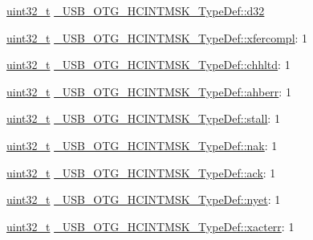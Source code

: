 \begin{DoxyCompactItemize}
\begin{tabbing}
\end{tabbing}\item 
\hyperlink{stdint_8h_a435d1572bf3f880d55459d9805097f62}{uint32\-\_\-t} \hyperlink{group___u_s_b___o_t_g___d_r_i_v_e_r_gac9280aa7152575d322edde06dbdb6aa4}{\-\_\-\-U\-S\-B\-\_\-\-O\-T\-G\-\_\-\-H\-C\-I\-N\-T\-M\-S\-K\-\_\-\-Type\-Def\-::d32}
\item 
\hyperlink{stdint_8h_a435d1572bf3f880d55459d9805097f62}{uint32\-\_\-t} \hyperlink{group___u_s_b___o_t_g___d_r_i_v_e_r_ga14412b191b38e4a7eb8f260ef7613fde}{\-\_\-\-U\-S\-B\-\_\-\-O\-T\-G\-\_\-\-H\-C\-I\-N\-T\-M\-S\-K\-\_\-\-Type\-Def\-::xfercompl}\-: 1
\item 
\hyperlink{stdint_8h_a435d1572bf3f880d55459d9805097f62}{uint32\-\_\-t} \hyperlink{group___u_s_b___o_t_g___d_r_i_v_e_r_ga520845ff45958d50ae4a81157db6e4d4}{\-\_\-\-U\-S\-B\-\_\-\-O\-T\-G\-\_\-\-H\-C\-I\-N\-T\-M\-S\-K\-\_\-\-Type\-Def\-::chhltd}\-: 1
\item 
\hyperlink{stdint_8h_a435d1572bf3f880d55459d9805097f62}{uint32\-\_\-t} \hyperlink{group___u_s_b___o_t_g___d_r_i_v_e_r_gada60e63ae630cebc4f260a670bc2a79f}{\-\_\-\-U\-S\-B\-\_\-\-O\-T\-G\-\_\-\-H\-C\-I\-N\-T\-M\-S\-K\-\_\-\-Type\-Def\-::ahberr}\-: 1
\item 
\hyperlink{stdint_8h_a435d1572bf3f880d55459d9805097f62}{uint32\-\_\-t} \hyperlink{group___u_s_b___o_t_g___d_r_i_v_e_r_gaf98c0c2f8a26d5aab736432dbe766081}{\-\_\-\-U\-S\-B\-\_\-\-O\-T\-G\-\_\-\-H\-C\-I\-N\-T\-M\-S\-K\-\_\-\-Type\-Def\-::stall}\-: 1
\item 
\hyperlink{stdint_8h_a435d1572bf3f880d55459d9805097f62}{uint32\-\_\-t} \hyperlink{group___u_s_b___o_t_g___d_r_i_v_e_r_ga103fcc638785131143028bce08cb0680}{\-\_\-\-U\-S\-B\-\_\-\-O\-T\-G\-\_\-\-H\-C\-I\-N\-T\-M\-S\-K\-\_\-\-Type\-Def\-::nak}\-: 1
\item 
\hyperlink{stdint_8h_a435d1572bf3f880d55459d9805097f62}{uint32\-\_\-t} \hyperlink{group___u_s_b___o_t_g___d_r_i_v_e_r_ga0159abb7609563116d0b50b871d0ddfa}{\-\_\-\-U\-S\-B\-\_\-\-O\-T\-G\-\_\-\-H\-C\-I\-N\-T\-M\-S\-K\-\_\-\-Type\-Def\-::ack}\-: 1
\item 
\hyperlink{stdint_8h_a435d1572bf3f880d55459d9805097f62}{uint32\-\_\-t} \hyperlink{group___u_s_b___o_t_g___d_r_i_v_e_r_ga34610fba93509474e4236783355355a6}{\-\_\-\-U\-S\-B\-\_\-\-O\-T\-G\-\_\-\-H\-C\-I\-N\-T\-M\-S\-K\-\_\-\-Type\-Def\-::nyet}\-: 1
\item 
\hyperlink{stdint_8h_a435d1572bf3f880d55459d9805097f62}{uint32\-\_\-t} \hyperlink{group___u_s_b___o_t_g___d_r_i_v_e_r_ga575ede38d9a02aeb3b8a2e6952ac1007}{\-\_\-\-U\-S\-B\-\_\-\-O\-T\-G\-\_\-\-H\-C\-I\-N\-T\-M\-S\-K\-\_\-\-Type\-Def\-::xacterr}\-: 1

\end{DoxyCompactItemize}
